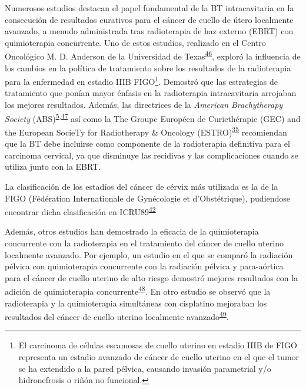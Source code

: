 \documentclass[
  a4paper,
]{scrreprt}
\begin{document}
Numerosos estudios destacan el papel fundamental de la BT intracavitaria
en la consecución de resultados curativos para el cáncer de cuello de
útero localmente avanzado, a menudo administrada tras radioterapia de
haz externo (EBRT) con quimioterapia concurrente. Uno de estos estudios,
realizado en el Centro Oncológico M. D. Anderson de la Universidad de
Texas\textsuperscript{\protect\hyperlink{ref-logsdon1999}{46}}, exploró
la influencia de los cambios en la política de tratamiento sobre los
resultados de la radioterapia para la enfermedad en estadio IIIB
FIGO\footnote{El carcinoma de células escamosas de cuello uterino en
  estadio IIIB de FIGO representa un estadio avanzado de cáncer de
  cuello uterino en el que el tumor se ha extendido a la pared pélvica,
  causando invasión parametrial y/o hidronefrosis o riñón no funcional.}.
Demostró que las estrategias de tratamiento que ponían mayor énfasis en
la radioterapia intracavitaria arrojaban los mejores resultados. Además,
las directrices de la \emph{American Brachytherapy Society}
(ABS)\textsuperscript{\protect\hyperlink{ref-viswanathan2012a}{5},\protect\hyperlink{ref-viswanathan2012}{47}}
así como la The Groupe Européen de Curiethérapie (GEC) and the European
SocieTy for Radiotherapy \& Oncology
(ESTRO)\textsuperscript{\protect\hyperlink{ref-dimopoulos2012}{35}}
recomiendan que la BT debe incluirse como componente de la radioterapia
definitiva para el carcinoma cervical, ya que disminuye las recidivas y
las complicaciones cuando se utiliza junto con la EBRT.

\begin{tcolorbox}[enhanced jigsaw, leftrule=.75mm, bottomtitle=1mm, colframe=quarto-callout-note-color-frame, toptitle=1mm, breakable, colbacktitle=quarto-callout-note-color!10!white, colback=white, titlerule=0mm, toprule=.15mm, title=\textcolor{quarto-callout-note-color}{\faInfo}\hspace{0.5em}{Nota}, coltitle=black, arc=.35mm, rightrule=.15mm, bottomrule=.15mm, left=2mm, opacityback=0, opacitybacktitle=0.6]

La clasificación de los estadíos del cáncer de cérvix más utilizada es
la de la FIGO (Fédération Internationale de Gynécologie et
d'Obstétrique), pudiendose encontrar dicha clasificación en
ICRU89\textsuperscript{\protect\hyperlink{ref-ICRU89}{42}}

\end{tcolorbox}

Además, otros estudios han demostrado la eficacia de la quimioterapia
concurrente con la radioterapia en el tratamiento del cáncer de cuello
uterino localmente avanzado. Por ejemplo, un estudio en el que se
comparó la radiación pélvica con quimioterapia concurrente con la
radiación pélvica y para-aórtica para el cáncer de cuello uterino de
alto riesgo demostró mejores resultados con la adición de quimioterapia
concurrente\textsuperscript{\protect\hyperlink{ref-pelvicr1999}{48}}. En
otro estudio se observó que la radioterapia y la quimioterapia
simultáneas con cisplatino mejoraban los resultados del cáncer de cuello
uterino localmente
avanzado\textsuperscript{\protect\hyperlink{ref-concurre1999}{49}}.
\end{document}
